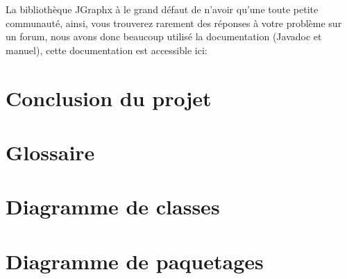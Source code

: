 \documentclass[12pt,a4paper,openany]{book}
\begin{document}
	La bibliothèque JGraphx à le grand défaut de n'avoir qu'une toute petite communauté, ainsi, vous trouverez rarement des réponses à votre problème
	sur un forum, nous avons donc beaucoup utilisé la documentation (Javadoc et manuel), cette documentation est accessible ici: 
	
	\chapter{Conclusion du projet}
	
	\closeout\glossaireVar
	\appendix
	\chapter{Glossaire}\label{glossaire}
	\begin{sortedlist}
		
	\end{sortedlist}
	\chapter{Diagramme de classes}
	\chapter{Diagramme de paquetages}
\end{document}
